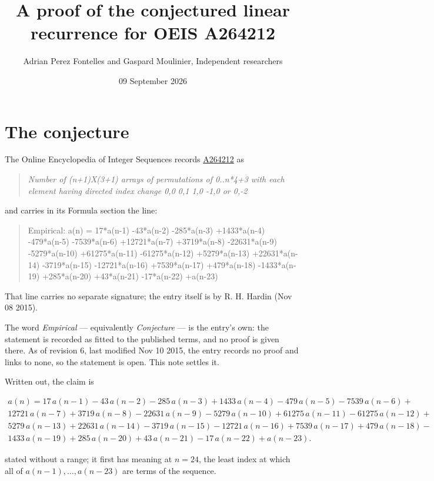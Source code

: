 \documentclass[11pt]{article}
\title{A proof of the conjectured linear recurrence for OEIS A264212}
\author{Adrian Perez Fontelles and Gaspard Moulinier, Independent researchers}
\date{09 September 2026}
\theoremstyle{definition}
\begin{document}
\maketitle
\section{The conjecture}

The Online Encyclopedia of Integer Sequences records \href{https://oeis.org/A264212}{A264212} as

\begin{quote}\itshape Number of (n+1)X(3+1) arrays of permutations of 0..n*4+3 with each element having directed index change 0,0 0,1 1,0 -1,0 or 0,-2\end{quote}

and carries in its Formula section the line:

\begin{quote}\ttfamily Empirical: a(n) = 17*a(n-1) -43*a(n-2) -285*a(n-3) +1433*a(n-4) -479*a(n-5) -7539*a(n-6) +12721*a(n-7) +3719*a(n-8) -22631*a(n-9) -5279*a(n-10) +61275*a(n-11) -61275*a(n-12) +5279*a(n-13) +22631*a(n-14) -3719*a(n-15) -12721*a(n-16) +7539*a(n-17) +479*a(n-18) -1433*a(n-19) +285*a(n-20) +43*a(n-21) -17*a(n-22) +a(n-23)\end{quote}

That line carries no separate signature; the entry itself is by R. H. Hardin (Nov 08 2015).

The word {\itshape Empirical} --- equivalently {\itshape Conjecture} --- is the entry's own: the statement is recorded as fitted to the published terms, and no proof is given there. As of revision 6, last modified Nov 10 2015, the entry records no proof and links to none, so the statement is open. This note settles it.

Written out, the claim is

\begin{multline*} a(n) = 17\,a(n-1) - 43\,a(n-2) - 285\,a(n-3) + 1433\,a(n-4) - 479\,a(n-5) - 7539\,a(n-6) + \\ 12721\,a(n-7) + 3719\,a(n-8) - 22631\,a(n-9) - 5279\,a(n-10) + 61275\,a(n-11) - 61275\,a(n-12) + \\ 5279\,a(n-13) + 22631\,a(n-14) - 3719\,a(n-15) - 12721\,a(n-16) + 7539\,a(n-17) + 479\,a(n-18) - \\ 1433\,a(n-19) + 285\,a(n-20) + 43\,a(n-21) - 17\,a(n-22) + a(n-23). \end{multline*}

stated without a range; it first has meaning at $n = 24$, the least index at which all of $a(n-1),\dots,a(n-23)$ are terms of the sequence.
\end{document}
